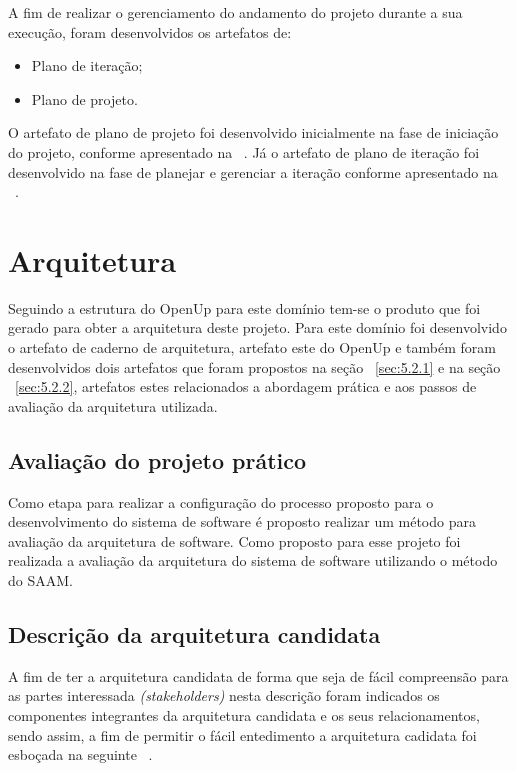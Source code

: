 A fim de realizar o gerenciamento do andamento do projeto durante a sua execução, foram desenvolvidos os artefatos de: 
\begin{itemize}
    \item Plano de iteração;
    \item Plano de projeto.
\end{itemize}

O artefato de plano de projeto foi desenvolvido inicialmente na fase de iniciação do projeto, conforme apresentado na ~. Já o artefato de plano de iteração foi desenvolvido na fase de planejar e gerenciar a iteração conforme apresentado na ~.

\section{Arquitetura}

Seguindo a estrutura do \acrfull{OpenUp} para este domínio tem-se  o produto que foi gerado para obter a arquitetura deste projeto. Para este domínio foi desenvolvido o artefato de caderno de arquitetura, artefato este do \acrfull{OpenUp} e também foram desenvolvidos dois artefatos que foram propostos na seção ~\ref{sec:5.2.1} e na seção ~\ref{sec:5.2.2}, artefatos estes relacionados a abordagem prática e aos passos de avaliação da arquitetura utilizada.

\subsection{Avaliação do projeto prático}

Como etapa para realizar a configuração do processo proposto para o desenvolvimento do sistema de software é proposto realizar um método para avaliação da arquitetura de software. Como proposto para esse projeto foi realizada a avaliação da arquitetura do sistema de software utilizando o método do \acrfull{SAAM}.

\subsection{Descrição da arquitetura candidata}

A fim de ter a arquitetura candidata de forma que seja de fácil compreensão para as partes interessada \emph{(stakeholders)} nesta descrição foram indicados os componentes integrantes da arquitetura candidata e os seus relacionamentos, sendo assim, a fim de permitir o fácil entedimento a arquitetura cadidata foi esboçada na seguinte ~.

